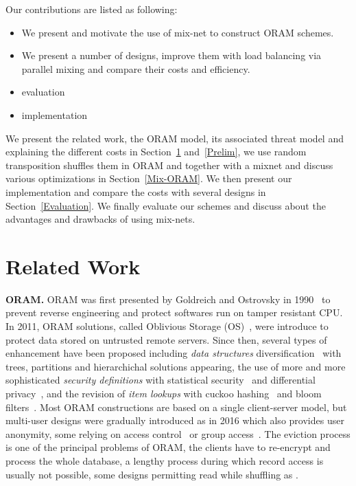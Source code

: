 \documentclass[USenglish,oneside,twocolumn]{article}
\begin{document}
\noindent Our contributions are listed as following:
\begin{itemize}
 \item We present and motivate the use of mix-net to construct ORAM schemes.
 \item We present a number of designs, improve them with load balancing via parallel mixing and compare their costs and efficiency.
 \item evaluation
 \item implementation
\end{itemize}

We present the related work, the ORAM model, its associated threat model and explaining the different costs in Section~\ref{Related} and~\ref{Prelim}, we use random transposition shuffles them in ORAM and together with a mixnet and discuss various optimizations in Section~\ref{Mix-ORAM}. We then present our implementation and compare the costs with several designs in Section~\ref{Evaluation}.
We finally evaluate our schemes and discuss about the advantages and drawbacks of using mix-nets.
%

\section{Related Work}\label{Related}
\noindent\textbf{ORAM.}
ORAM was first presented by Goldreich and Ostrovsky in 1990~\cite{ostrovsky1990efficient} to prevent reverse engineering and protect softwares run on tamper resistant CPU. In 2011, ORAM solutions, called Oblivious Storage (OS)~\cite{boneh2011}, were introduce to protect data stored on untrusted remote servers.
Since then, several types of enhancement have been proposed including \textit{data structures} diversification~\cite{goldreich1996software,stefanov2011towards,stefanov2013path,ren2014ring} with trees, partitions and hierarchichal solutions appearing,
the use of more and more sophisticated \textit{security definitions} with statistical security~\cite{damgaard2011perfectly,ajtai2010oblivious} and differential privacy~\cite{wagh2016root}, and the revision of \textit{item lookups} with cuckoo hashing~\cite{pinkas2010oblivious} and bloom filters~\cite{williams2008building}.
Most ORAM constructions are based on a single client-server model, but multi-user designs were gradually introduced as \cite{backesanonymous} in 2016 which also provides user anonymity, some relying on access control~\cite{franz2011oblivious} or group access~\cite{goodrich2012privacy}.
The eviction process is one of the principal problems of ORAM, the clients have to re-encrypt and process the whole database, a lengthy process during which record access is usually not possible, some designs permitting read while shuffling as \cite{boneh2011}.\\
\end{document}
